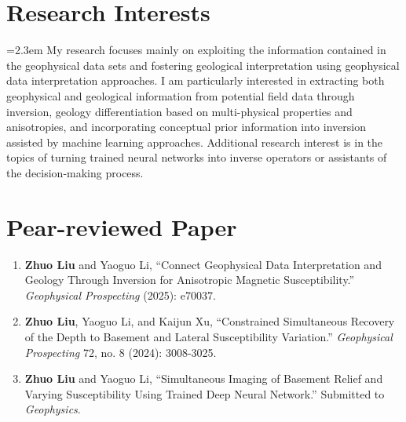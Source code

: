 \documentclass[paper=a4,fontsize=11pt]{scrartcl} %
\newcommand{\sepspace}{\vspace*{0.5em}}		%
\newcommand{\NewPart}[1]{\section*{{#1}}}
\begin{document}
\NewPart{Research Interests}{}
\noindent\hangindent=2.3em My research focuses mainly on exploiting the information contained in the geophysical data sets and fostering geological interpretation using geophysical data interpretation approaches. 
I am particularly interested in extracting both geophysical and geological information from potential field data through inversion, geology differentiation based on multi-physical properties and anisotropies, and incorporating conceptual prior information into inversion assisted by machine learning approaches. 
Additional research interest is in the topics of turning trained neural networks into inverse operators or assistants of the decision-making process.
\sepspace




\NewPart{Pear-reviewed Paper}{}
\begin{enumerate}
    \item \textbf{Zhuo Liu} and Yaoguo Li, “Connect Geophysical Data Interpretation and Geology Through Inversion for Anisotropic Magnetic Susceptibility.” \textit{Geophysical Prospecting} (2025): e70037.
    \item \textbf{Zhuo Liu}, Yaoguo Li, and Kaijun Xu, “Constrained Simultaneous Recovery of the Depth to Basement and Lateral Susceptibility Variation.” \textit{Geophysical Prospecting} 72, no. 8 (2024): 3008-3025.
    \item \textbf{Zhuo Liu} and Yaoguo Li, “Simultaneous Imaging of Basement Relief and Varying Susceptibility Using Trained Deep Neural Network.” Submitted to \textit{Geophysics}.
\end{enumerate}
\sepspace
\end{document}

